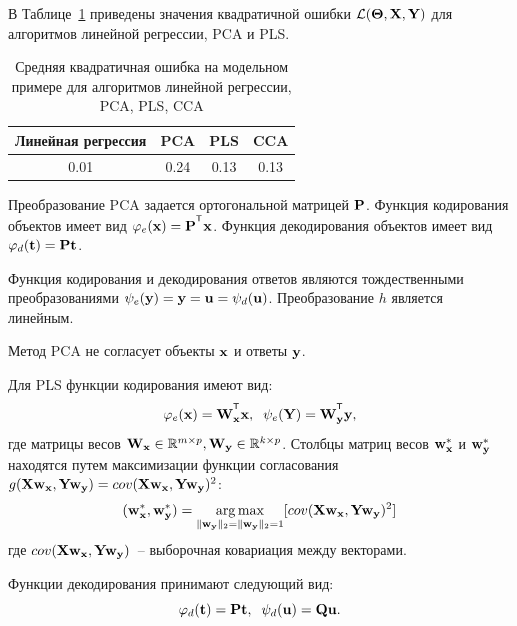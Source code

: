 В Таблице~\ref{ch1:tbl:toy_example_results} приведены значения квадратичной ошибки $\mathcal{L}(\boldsymbol{\Theta}, \mathbf{X}, \mathbf{Y})$ для алгоритмов линейной регрессии, PCA и PLS.

\begin{table}[]
	\centering
	\begin{tabular}{|c|c|c|c|}
		\hline
		\textbf{Линейная регрессия} & \textbf{PCA}   & \textbf{PLS}  &  \textbf{CCA}  \\ \hline
		0.01 &  0.24   &  0.13 &  0.13 \\ \hline
	\end{tabular}
	\caption{Средняя квадратичная ошибка на модельном примере для алгоритмов линейной регрессии, PCA, PLS, CCA}
	\label{ch1:tbl:toy_example_results}
\end{table} 









\hrulefill

Преобразование PCA задается ортогональной матрицей $\mathbf{P}$. Функция кодирования объектов имеет вид $\varphi_e(\bx) = \bP^{\T}\bx$. Функция декодирования объектов имеет вид $\varphi_d(\mathbf{t}) = \mathbf{P}\mathbf{t}$. 

Функция кодирования и декодирования ответов являются тождественными преобразованиями $\psi_e(\mathbf{y}) =  \mathbf{y} = \mathbf{u} = \psi_d(\mathbf{u})$. Преобразование $h$ является линейным.

Метод PCA не согласует объекты $\mathbf{x}$ и ответы $\mathbf{y}$.


\hrulefill

Для PLS  функции кодирования имеют вид:
\begin{equation}
	\varphi_e(\bx) = \bW_{\bx}^{\T}\bx , \;\;
	\psi_e(\bY) = \bW_{\by}^{\T}\by ,
\end{equation} 
где матрицы весов $\mathbf{W}_{\mathbf{x}} \in \mathbb{R}^{m \times p}, \mathbf{W}_{\mathbf{y}} \in \mathbb{R}^{k \times p}$. Столбцы матриц весов $\mathbf{w}_{\mathbf{x}}^{*}$ и $\mathbf{w}_{\mathbf{y}}^{*}$ 
находятся путем максимизации функции согласования $g(\mathbf{X} \mathbf{w}_{\mathbf{x}}, \mathbf{Y} \mathbf{w}_{\mathbf{y}}) = cov (\mathbf{X} \mathbf{w}_{\mathbf{x}}, \mathbf{Y} \mathbf{w}_{\mathbf{y}})^{2}$:
\begin{equation}
	(\mathbf{w}_{\mathbf{x}}^{*}, \mathbf{w}_{\mathbf{y}}^{*}) = \mathop{\arg \max}\limits_{\|\mathbf{w}_{\mathbf{y}}\|_{2}=\|\mathbf{w}_{\mathbf{y}}\|_{2}=1}[ cov(\mathbf{X} \mathbf{w}_{\mathbf{x}}, \mathbf{Y} \mathbf{w}_{\mathbf{y}})^{2}]
	\label{eq:PLSpr3}
\end{equation}
где $cov(\mathbf{X} \mathbf{w}_{\mathbf{x}}, \mathbf{Y} \mathbf{w}_{\mathbf{y}})$~-- выборочная ковариация между векторами.

Функции декодирования принимают следующий вид:
\begin{equation}
	\varphi_d(\mathbf{t}) = \mathbf{P}\mathbf{t}, \;\;
	\psi_d(\mathbf{u}) = \mathbf{Q}\mathbf{u}.
\end{equation} 

